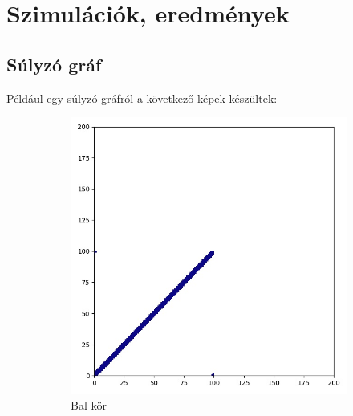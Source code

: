 \chapter{Szimulációk, eredmények}

\section{Súlyzó gráf}

Például egy súlyzó gráfról a következő képek készültek:

\begin{figure}[H]
  \centering
  \begin{subfigure}{.3\linewidth}
    \centering
    \includegraphics[width=\linewidth]{./figures/sulyzo/subgraph_00.jpg}
    \caption{Bal kör}
    \label{fig:sub1}
  \end{subfigure}
  \begin{subfigure}{.3\linewidth}
    \centering

\end{subfigure}
\end{figure}
